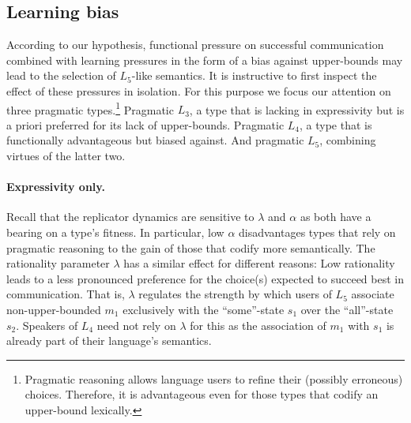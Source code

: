 \documentclass[a4paper]{article}
\begin{document}
%
\subsection{Learning bias}\label{subsec:bias}
According to our hypothesis, functional pressure on successful communication combined with learning pressures in the form of a bias against upper-bounds may lead to the selection of $L_5$-like semantics. It is instructive to first inspect the effect of these pressures in isolation. For this purpose we focus our attention on three pragmatic types.\footnote{Pragmatic reasoning allows language users to refine their (possibly erroneous) choices. Therefore, it is advantageous even for those types that codify an upper-bound lexically.} Pragmatic $L_3$, a type that is lacking in expressivity but is a priori preferred for its lack of upper-bounds. Pragmatic $L_4$, a type that is functionally advantageous but biased against. And pragmatic $L_5$, combining virtues of the latter two.  

\paragraph{Expressivity only.} Recall that the replicator dynamics are sensitive to $\lambda$ and $\alpha$ as both have a bearing on a type's fitness. In particular, low $\alpha$ disadvantages types that rely on pragmatic reasoning to the gain of those that codify more semantically. The rationality parameter $\lambda$ has a similar effect for different reasons: Low rationality leads to a less pronounced preference for the choice(s) expected to succeed best in communication. That is, $\lambda$ regulates the strength by which users of $L_5$ associate non-upper-bounded $m_1$ exclusively with the ``some''-state $s_1$ over the ``all''-state $s_2$. Speakers of $L_4$ need not rely on $\lambda$ for this as the association of $m_1$ with $s_1$ is already part of their language's semantics.
\end{document}
